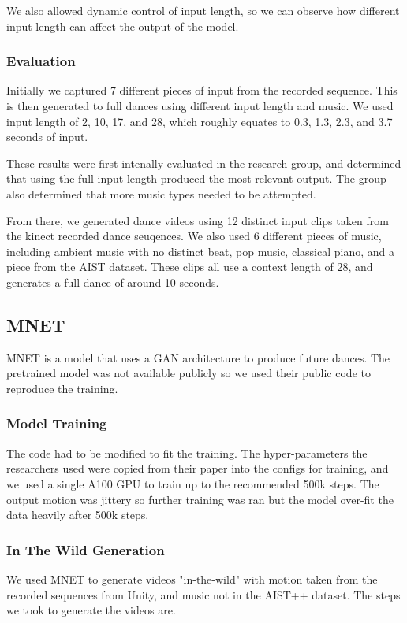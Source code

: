 \documentclass[final,5p,times,authoryear]{article}
\begin{document}
We also allowed dynamic control of input length, so we can observe how different
input length can affect the output of the model.

\subsubsection{Evaluation}
Initially we captured 7 different pieces of input from the recorded sequence.
This is then generated to full dances using different input length and music. We
used input length of 2, 10, 17, and 28, which roughly equates to 0.3, 1.3, 2.3,
and 3.7 seconds of input.

These results were first intenally evaluated in the research group, and
determined that using the full input length produced the most relevant output.
The group also determined that more music types needed to be attempted.

From there, we generated dance videos using 12 distinct input clips taken from the kinect
recorded dance seuqences. We also used 6 different pieces of music, including
ambient music with no distinct beat, pop music, classical piano, and a piece
from the AIST dataset. These clips all use a context length of 28, and generates
a full dance of around 10 seconds.

\subsection{MNET}

MNET is a model that uses a GAN architecture to produce future dances. The
pretrained model was not available publicly so we used their public code to
reproduce the training.

\subsubsection{Model Training}

The code had to be modified to fit the training. The hyper-parameters the
researchers used were copied from their paper into the configs for training, and
we used a single A100 GPU to train up to the recommended 500k steps. The output
motion was jittery so further training was ran but the model over-fit the data
heavily after 500k steps.

\subsubsection{In The Wild Generation}
We used MNET to generate videos "in-the-wild" with motion taken from the
recorded sequences from Unity, and music not in the AIST++ dataset. The steps we
took to generate the videos are.
\end{document}
